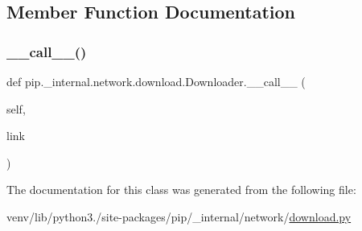 \subsection{Member Function Documentation}
\mbox{\label{classpip_1_1__internal_1_1network_1_1download_1_1Downloader_a18b71b3aa6b3edb6bcd1299536d010ef}} 
\subsubsection{\texorpdfstring{\+\_\+\+\_\+call\+\_\+\+\_\+()}{\_\_call\_\_()}}
{\footnotesize\ttfamily def pip.\+\_\+internal.\+network.\+download.\+Downloader.\+\_\+\+\_\+call\+\_\+\+\_\+ (\begin{DoxyParamCaption}\item[{}]{self,  }\item[{}]{link }\end{DoxyParamCaption})}



The documentation for this class was generated from the following file\+:\begin{DoxyCompactItemize}
\item 
venv/lib/python3./site-\/packages/pip/\+\_\+internal/network/\hyperlink{network_2download_8py}{download.\+py}\end{DoxyCompactItemize}
